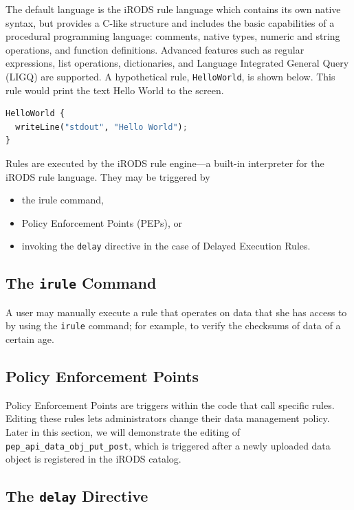 \documentclass[10pt,oneside]{memoir}
\begin{document}
The default language is the iRODS rule language which contains its own native syntax, but provides a C-like structure and includes the basic capabilities of a procedural programming language: comments, native types, numeric and string operations, and function definitions. Advanced features such as regular expressions, list operations, dictionaries, and Language Integrated General Query (LIGQ) are supported. A hypothetical rule, \texttt{HelloWorld}, is shown below. This rule would print the text Hello World to the screen.

\begin{lstlisting}[language=python]
HelloWorld {
  writeLine("stdout", "Hello World");
}
\end{lstlisting}

Rules are executed by the iRODS rule engine---a built-in interpreter for the iRODS rule language. They may be triggered by
\begin{itemize}
 \item the irule command,
 \item Policy Enforcement Points (PEPs), or
 \item invoking the \texttt{delay} directive in the case of Delayed Execution Rules.
\end{itemize}

\subsection{The \texttt{irule} Command}

A user may manually execute a rule that operates on data that she has access to by using the \texttt{irule} command; for example, to verify the checksums of data of a certain age.

\subsection{Policy Enforcement Points}

Policy Enforcement Points are triggers within the code that call specific rules. Editing these rules lets administrators change their data management policy. Later in this section, we will demonstrate the editing of \texttt{pep\_api\_data\_obj\_put\_post}, which is triggered after a newly uploaded data object is registered in the iRODS catalog.

\subsection{The \texttt{delay} Directive}
\end{document}
